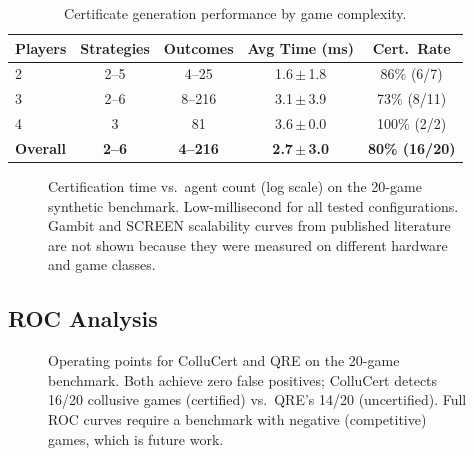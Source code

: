 \documentclass[11pt]{article}
\begin{document}
\begin{table}[t]
\centering
\caption{Certificate generation performance by game complexity.}
\begin{tabular}{lcccc}
\toprule
\textbf{Players} & \textbf{Strategies} & \textbf{Outcomes} & \textbf{Avg Time (ms)} & \textbf{Cert.\ Rate} \\
\midrule
2 & 2--5 & 4--25 & 1.6\,$\pm$\,1.8 & 86\% (6/7) \\
3 & 2--6 & 8--216 & 3.1\,$\pm$\,3.9 & 73\% (8/11) \\
4 & 3 & 81 & 3.6\,$\pm$\,0.0 & 100\% (2/2) \\
\midrule
\textbf{Overall} & \textbf{2--6} & \textbf{4--216} & \textbf{2.7\,$\pm$\,3.0} & \textbf{80\% (16/20)} \\
\bottomrule
\end{tabular}
\end{table}

\begin{figure}[t]
\centering
{}
\caption{Certification time vs.\ agent count (log scale) on the 20-game synthetic benchmark. Low-millisecond for all tested configurations. Gambit and SCREEN scalability curves from published literature are not shown because they were measured on different hardware and game classes.}
\label{fig:scalability}
\end{figure}

\subsection{ROC Analysis}

\begin{figure}[t]
\centering
{}
\caption{Operating points for ColluCert and QRE on the 20-game benchmark. Both achieve zero false positives; ColluCert detects 16/20 collusive games (certified) vs.\ QRE's 14/20 (uncertified). Full ROC curves require a benchmark with negative (competitive) games, which is future work.}
\label{fig:roc}
\end{figure}
\end{document}

